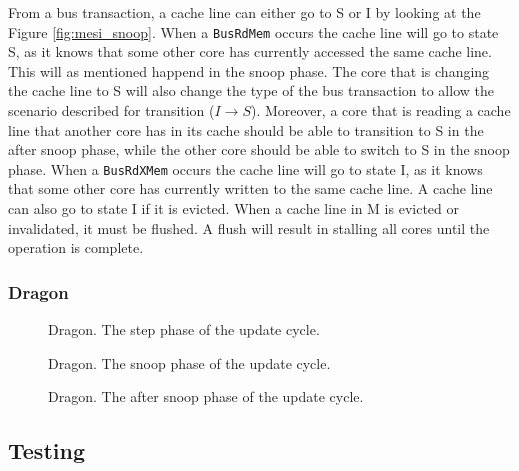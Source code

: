 From a bus transaction, a cache line can either go to S or I by looking at the Figure \ref{fig:mesi_snoop}.
When a \texttt{BusRdMem} occurs the cache line will go to state S, as it knows that some other core has currently accessed the same cache line.
This will as mentioned happend in the snoop phase.
The core that is changing the cache line to S will also change the type of the bus transaction to allow the scenario described for transition ($I \to S$).
Moreover, a core that is reading a cache line that another core has in its cache should be able to transition to S in the after snoop phase, while the other core should be able to switch to S in the snoop phase.
When a \texttt{BusRdXMem} occurs the cache line will go to state I, as it knows that some other core has currently written to the same cache line.
A cache line can also go to state I if it is evicted.
When a cache line in M is evicted or invalidated, it must be flushed.
A flush will result in stalling all cores until the operation is complete.

\subsubsection{Dragon}

\begin{figure}[H]
    \centering
    \caption{Dragon. The step phase of the update cycle.}
    \label{fig:dragon}
\end{figure}


\begin{figure}[H]
    \centering
    \caption{Dragon. The snoop phase of the update cycle.}
    \label{fig:dragon_snoop}
\end{figure}

\begin{figure}[H]
    \centering
    \caption{Dragon. The after snoop phase of the update cycle.}
    \label{fig:dragon_after_snoop}
\end{figure}


\subsection{Testing}

